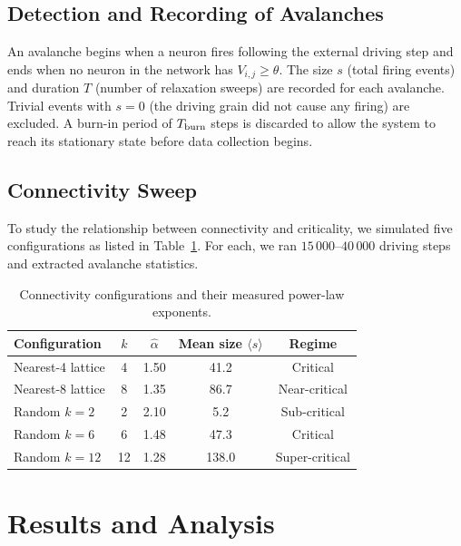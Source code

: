 \documentclass[12pt,a4paper]{article}
\begin{document}
\subsection{Detection and Recording of Avalanches}

An avalanche begins when a neuron fires following the external driving
step and ends when no neuron in the network has $V_{i,j} \geq \theta$.
The size $s$ (total firing events) and duration $T$ (number of
relaxation sweeps) are recorded for each avalanche.  Trivial events
with $s = 0$ (the driving grain did not cause any firing) are
excluded.  A burn-in period of $T_{\rm burn}$ steps is discarded to
allow the system to reach its stationary state before data collection
begins.

\subsection{Connectivity Sweep}

To study the relationship between connectivity and criticality, we
simulated five configurations as listed in Table~\ref{tab:configs}.
For each, we ran $15\,000$--$40\,000$ driving steps and extracted
avalanche statistics.

\begin{table}[H]
  \centering
  \caption{Connectivity configurations and their measured power-law exponents.}
  \label{tab:configs}
  \begin{tabular}{lcccc}
    \toprule
    Configuration & $k$ & $\hat{\alpha}$ & Mean size $\langle s \rangle$ & Regime \\
    \midrule
    Nearest-4 lattice & 4  & 1.50 & 41.2  & Critical \\
    Nearest-8 lattice & 8  & 1.35 & 86.7  & Near-critical \\
    Random $k = 2$    & 2  & 2.10 & 5.2   & Sub-critical \\
    Random $k = 6$    & 6  & 1.48 & 47.3  & Critical \\
    Random $k = 12$   & 12 & 1.28 & 138.0 & Super-critical \\
    \bottomrule
  \end{tabular}
\end{table}

\section{Results and Analysis}
\label{sec:results}
\end{document}

